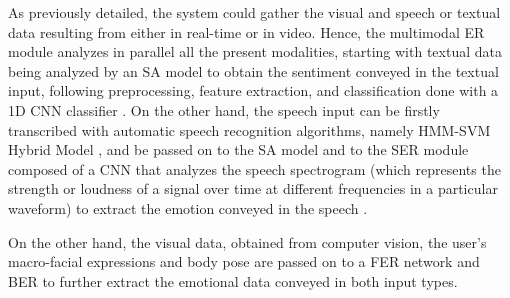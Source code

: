 \documentclass[runningheads]{llncs}
\begin{document}

As previously detailed, the system could gather the visual and speech or textual data resulting from either in real-time or in video. Hence, the multimodal ER module analyzes in parallel all the present modalities, starting with textual data being analyzed by an SA model to obtain the sentiment conveyed in the textual input, following preprocessing, feature extraction, and classification done with a 1D CNN classifier \cite{hung_beyond_2023}. On the other hand, the speech input can be firstly transcribed with automatic speech recognition algorithms, namely HMM-SVM Hybrid Model \cite{malik_automatic_2021}, and be passed on to the SA model and to the SER module composed of a CNN that analyzes the speech spectrogram (which represents the strength or loudness of a signal over time at different frequencies in a particular waveform) to extract the emotion conveyed in the speech \cite{Badshah2017}.

On the other hand, the visual data, obtained from computer vision, the user's macro-facial expressions and body pose are passed on to a FER network and BER to further extract the emotional data conveyed in both input types.
\end{document}
